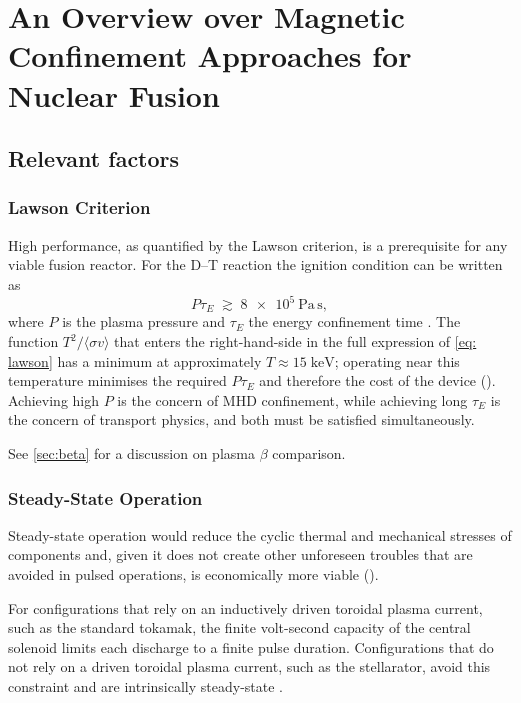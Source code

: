 \chapter{An Overview over Magnetic Confinement Approaches for Nuclear Fusion}
\label{chap: An Overview over Magnetic Confinement Approaches for Nuclear Fusion}

\section{Relevant factors}

\subsection{Lawson Criterion}

High performance, as quantified by the Lawson criterion, is a prerequisite for
any viable fusion reactor.
For the D--T reaction the ignition condition can be written as
\begin{equation}
    P\tau_E \;\gtrsim\; \SI{8e5}{\pascal \, \second},
    \label{eq: lawson}
\end{equation}
where $P$ is the plasma pressure and $\tau_E$ the energy confinement time
\cite{Freidberg2014}.
The function $T^2/\langle\sigma v\rangle$ that enters the right-hand-side in the full expression of \eqref{eq: lawson} has a
minimum at approximately $T\approx 15\;\text{keV}$; operating near this
temperature minimises the required $P\tau_E$ and therefore the cost of the device
(\cite{Freidberg2014}).
Achieving high $P$ is the concern of MHD confinement, while achieving
long $\tau_E$ is the concern of transport physics, and both must be satisfied simultaneously.

See \autoref{sec:beta} for a discussion on plasma $\beta$ comparison.

\subsection{Steady-State Operation}
\label{subsec: Steady-state operation}

Steady-state operation would reduce the cyclic thermal and mechanical stresses of components and,
given it does not create other unforeseen troubles that are avoided in pulsed operations,
is economically more viable (\cite{Freidberg2014}).

For configurations that rely on an inductively driven toroidal plasma current,
such as the standard tokamak, the finite volt-second capacity of the central
solenoid limits each discharge to a finite pulse duration.
Configurations that do not rely on a driven toroidal plasma current, such as
the stellarator, avoid this constraint and are intrinsically steady-state \cite{Freidberg2014}.



